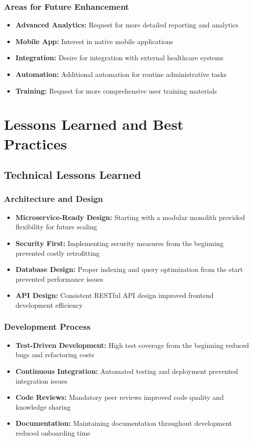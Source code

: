 \documentclass[12pt,a4paper]{article}
\begin{document}
\subsubsection{Areas for Future Enhancement}
\begin{itemize}
    \item \textbf{Advanced Analytics:} Request for more detailed reporting and analytics
    \item \textbf{Mobile App:} Interest in native mobile applications
    \item \textbf{Integration:} Desire for integration with external healthcare systems
    \item \textbf{Automation:} Additional automation for routine administrative tasks
    \item \textbf{Training:} Request for more comprehensive user training materials
\end{itemize}

\section{Lessons Learned and Best Practices}

\subsection{Technical Lessons Learned}

\subsubsection{Architecture and Design}
\begin{itemize}
    \item \textbf{Microservice-Ready Design:} Starting with a modular monolith provided flexibility for future scaling
    \item \textbf{Security First:} Implementing security measures from the beginning prevented costly retrofitting
    \item \textbf{Database Design:} Proper indexing and query optimization from the start prevented performance issues
    \item \textbf{API Design:} Consistent RESTful API design improved frontend development efficiency
\end{itemize}

\subsubsection{Development Process}
\begin{itemize}
    \item \textbf{Test-Driven Development:} High test coverage from the beginning reduced bugs and refactoring costs
    \item \textbf{Continuous Integration:} Automated testing and deployment prevented integration issues
    \item \textbf{Code Reviews:} Mandatory peer reviews improved code quality and knowledge sharing
    \item \textbf{Documentation:} Maintaining documentation throughout development reduced onboarding time
\end{itemize}
\end{document}
